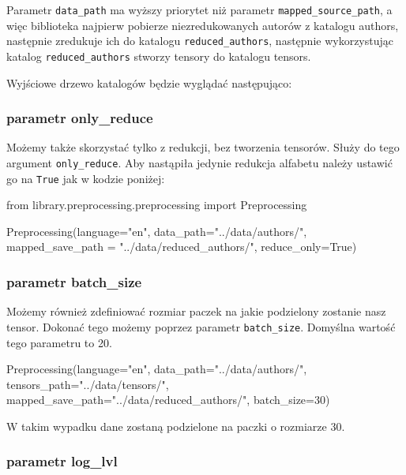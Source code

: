 Parametr \texttt{data\_path} ma wyższy priorytet niż parametr \texttt{mapped\_source\_path}, a więc biblioteka najpierw 
pobierze niezredukowanych autorów z katalogu authors, następnie zredukuje ich do katalogu \texttt{reduced\_authors},
następnie wykorzystując katalog \texttt{reduced\_authors} stworzy tensory do katalogu tensors.

Wyjściowe drzewo katalogów będzie wyglądać następująco:

\myspace
{}

\myspace

\subsubsection{parametr only\_reduce}
Możemy także skorzystać tylko z redukcji, bez tworzenia tensorów. Służy do tego argument \texttt{only\_reduce}.
Aby nastąpiła jedynie redukcja alfabetu należy ustawić go na \texttt{True} jak w kodzie poniżej:

\begin{python}
from library.preprocessing.preprocessing import Preprocessing

Preprocessing(language="en",
              data_path="../data/authors/",
              mapped_save_path = "../data/reduced_authors/",
              reduce_only=True) 

\end{python}

\subsubsection{parametr batch\_size}
Możemy również zdefiniować rozmiar paczek na jakie podzielony zostanie nasz tensor. Dokonać tego możemy poprzez
parametr \texttt{batch\_size}. Domyślna wartość tego parametru to 20.

\begin{python}
Preprocessing(language="en",
              data_path="../data/authors/",
              tensors_path="../data/tensors/",
              mapped_save_path="../data/reduced_authors/",
              batch_size=30)

\end{python}


W takim wypadku dane zostaną podzielone na paczki o rozmiarze 30.
\subsubsection{parametr log\_lvl}

